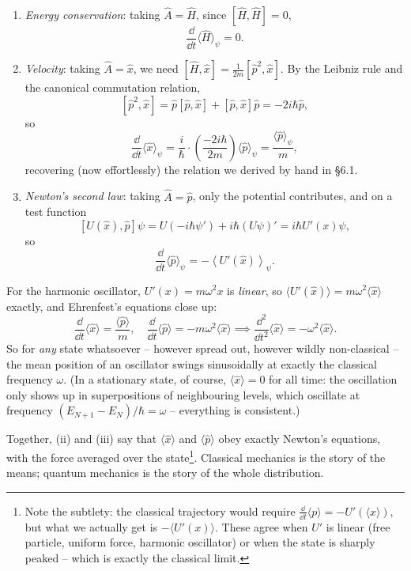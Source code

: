 \documentclass[a4paper]{scrartcl}
\begin{document}
\begin{enumerate}[label=(\roman*)]
    \item \emph{Energy conservation}: taking $\hat{A} = \hat{H}$, since $[\hat H, \hat H] = 0$,
    $$
    \frac{\dd}{\dd t}\langle \hat{H} \rangle_\psi = 0.
    $$
    \item \emph{Velocity}: taking $\hat{A} = \hat{x}$, we need $[\hat{H}, \hat{x}] = \frac{1}{2m}[\hat{p}^2, \hat{x}]$. By the Leibniz rule and the canonical commutation relation,
    $$
    [\hat p^2, \hat x] = \hat p [\hat p, \hat x] + [\hat p, \hat x]\hat p = -2i\hbar \hat p,
    $$
    so
    $$
    \frac{\dd}{\dd t} \langle \hat{x} \rangle_\psi = \frac{i}{\hbar} \cdot \left(\frac{-2 i \hbar}{2m}\right) \langle \hat{p}\rangle_\psi = \frac{\langle \hat{p} \rangle_\psi}{m},
    $$
    recovering (now effortlessly) the relation we derived by hand in \S 6.1.
    \item \emph{Newton's second law}: taking $\hat{A} = \hat{p}$, only the potential contributes, and on a test function
    $$
    [U(\hat x), \hat{p}]\psi = U \left(-i\hbar \psi'\right) + i\hbar (U\psi)' = i \hbar U'(x) \psi,
    $$
    so
    $$
    \frac{\dd}{\dd t} \langle \hat{p} \rangle_\psi = -\left\langle U'(\hat x) \right\rangle_\psi.
    $$
\end{enumerate}
\begin{example}
    For the harmonic oscillator, $U'(x) = m\omega^2 x$ is \emph{linear}, so $\langle U'(\hat x) \rangle = m \omega^2 \langle \hat{x} \rangle$ exactly, and Ehrenfest's equations close up:
    $$
    \frac{\dd}{\dd t}\langle \hat x \rangle = \frac{\langle \hat p \rangle}{m}, \quad \frac{\dd}{\dd t} \langle \hat{p} \rangle = -m\omega^2 \langle \hat{x} \rangle
    \implies \frac{\dd^2}{\dd t^2}\langle \hat{x} \rangle = -\omega^2 \langle \hat{x} \rangle.
    $$
    So for \emph{any} state whatsoever -- however spread out, however wildly non-classical -- the mean position of an oscillator swings sinusoidally at exactly the classical frequency $\omega$. (In a stationary state, of course, $\langle \hat x \rangle = 0$ for all time: the oscillation only shows up in superpositions of neighbouring levels, which oscillate at frequency $(E_{N+1} - E_N)/\hbar = \omega$ -- everything is consistent.)
\end{example}

Together, (ii) and (iii) say that $\langle \hat x \rangle$ and $\langle \hat p \rangle$ obey exactly Newton's equations, with the force averaged over the state\footnote{Note the subtlety: the classical trajectory would require $\frac{\dd}{\dd t}\langle p \rangle = -U'(\langle x \rangle)$, but what we actually get is $-\langle U'(x) \rangle$. These agree when $U'$ is linear (free particle, uniform force, harmonic oscillator) or when the state is sharply peaked -- which is exactly the classical limit.}. Classical mechanics is the story of the means; quantum mechanics is the story of the whole distribution.
\end{document}

